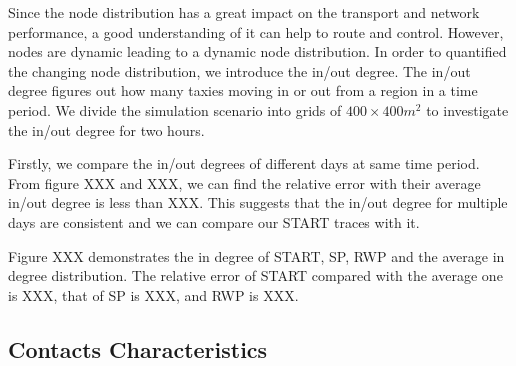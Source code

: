 Since the node distribution has a great impact on the transport and network performance, a good understanding of it can help to route and control.  However, nodes are dynamic leading to a dynamic node distribution. In order to quantified the changing node distribution,  we introduce the in/out degree. The in/out degree figures out how many taxies moving in or out from a region in a time period. 
We divide the simulation scenario into grids of $ 400\times 400 m^2$ to investigate the in/out degree for two hours. 

Firstly, we compare the in/out degrees of different days at same time period. From figure XXX and XXX, we can find the relative error with their average in/out degree is less than XXX. This suggests     that the in/out degree for multiple days are consistent and we can compare our START traces with it.

Figure XXX demonstrates the in degree of START, SP, RWP and the average in degree distribution. The relative error of START compared with the average one is XXX, that of SP is XXX,  and RWP is XXX.


\subsection{Contacts Characteristics}

